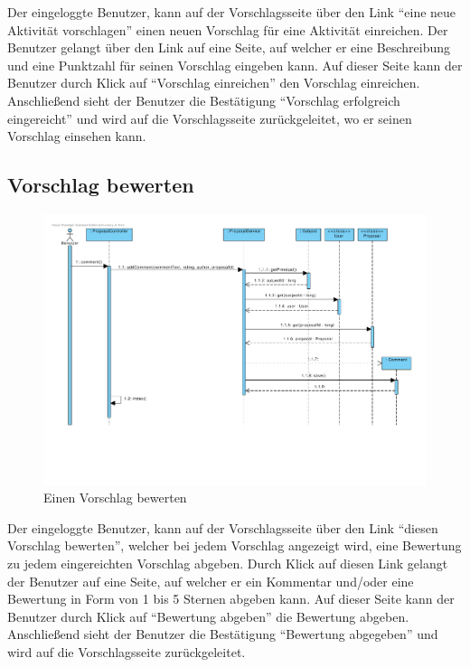 Der eingeloggte Benutzer, kann auf der Vorschlagsseite über den Link
``eine neue Aktivität vorschlagen'' einen neuen Vorschlag für eine
Aktivität einreichen. Der Benutzer gelangt über den Link auf eine
Seite, auf welcher er eine Beschreibung und eine Punktzahl für seinen Vorschlag
 eingeben kann. Auf dieser Seite kann der Benutzer durch Klick auf
 ``Vorschlag einreichen'' den Vorschlag einreichen. Anschließend sieht
 der Benutzer die Bestätigung ``Vorschlag erfolgreich eingereicht''
 und wird auf die Vorschlagsseite zurückgeleitet, wo er seinen
 Vorschlag einsehen kann.
 
\subsection{Vorschlag bewerten}

\begin{figure}[H]
  \centering
  \includegraphics[width=\textwidth, clip]{gfx/vorschlag_bewerten}
  \caption{Einen Vorschlag bewerten}
\end{figure}

Der eingeloggte Benutzer, kann auf der Vorschlagsseite über den Link
``diesen Vorschlag bewerten'', welcher bei jedem Vorschlag angezeigt
wird, eine Bewertung zu jedem eingereichten Vorschlag abgeben. Durch
Klick auf diesen Link gelangt der Benutzer auf eine Seite, auf welcher
er ein Kommentar und/oder eine Bewertung in Form von 1 bis 5 Sternen
abgeben kann. Auf dieser Seite kann der Benutzer durch Klick auf
 ``Bewertung abgeben'' die Bewertung abgeben. Anschließend sieht
 der Benutzer die Bestätigung ``Bewertung abgegeben'' und wird auf die Vorschlagsseite zurückgeleitet.
 

